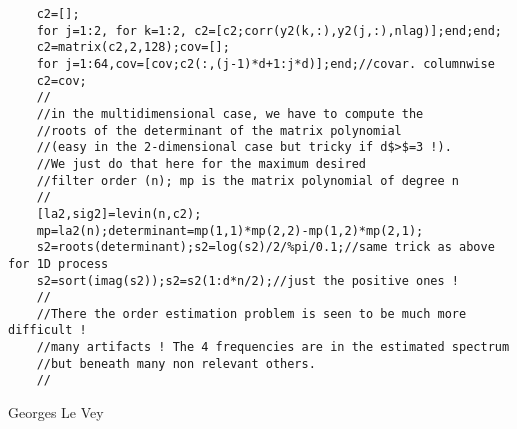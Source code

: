 \begin{examples}
\begin{Verbatim}
    c2=[];
    for j=1:2, for k=1:2, c2=[c2;corr(y2(k,:),y2(j,:),nlag)];end;end;
    c2=matrix(c2,2,128);cov=[];
    for j=1:64,cov=[cov;c2(:,(j-1)*d+1:j*d)];end;//covar. columnwise
    c2=cov;
    //
    //in the multidimensional case, we have to compute the 
    //roots of the determinant of the matrix polynomial 
    //(easy in the 2-dimensional case but tricky if d$>$=3 !). 
    //We just do that here for the maximum desired 
    //filter order (n); mp is the matrix polynomial of degree n
    //
    [la2,sig2]=levin(n,c2);
    mp=la2(n);determinant=mp(1,1)*mp(2,2)-mp(1,2)*mp(2,1);
    s2=roots(determinant);s2=log(s2)/2/%pi/0.1;//same trick as above for 1D process
    s2=sort(imag(s2));s2=s2(1:d*n/2);//just the positive ones !
    //
    //There the order estimation problem is seen to be much more difficult !
    //many artifacts ! The 4 frequencies are in the estimated spectrum 
    //but beneath many non relevant others.
    //
  \end{Verbatim}
\end{examples}
\begin{manseealso}
\end{manseealso}
\begin{authors}
  Georges Le Vey
\end{authors}
